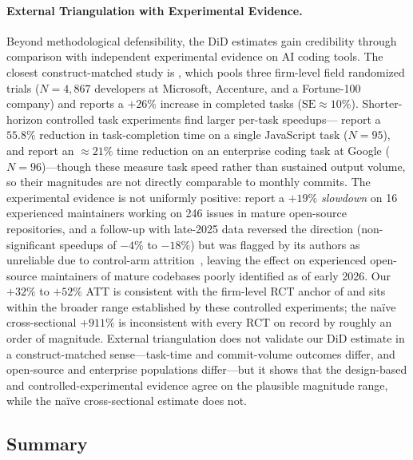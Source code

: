 \paragraph{External Triangulation with Experimental Evidence.}
\label{sec:triangulation}

Beyond methodological defensibility, the DiD estimates gain credibility through comparison with independent experimental evidence on AI coding tools.
The closest construct-matched study is \citet{cui2025effects}, which pools three firm-level field randomized trials ($N = 4{,}867$ developers at Microsoft, Accenture, and a Fortune-100 company) and reports a $+26\%$ increase in completed tasks ($\text{SE} \approx 10\%$).
Shorter-horizon controlled task experiments find larger per-task speedups---\citet{peng2023impact} report a $55.8\%$ reduction in task-completion time on a single JavaScript task ($N = 95$), and \citet{DBLP:conf/icse-seip/ParadisGMNMMZFC25} report an $\approx 21\%$ time reduction on an enterprise coding task at Google ($N = 96$)---though these measure task speed rather than sustained output volume, so their magnitudes are not directly comparable to monthly commits.
The experimental evidence is not uniformly positive: \citet{becker2025measuring} report a $+19\%$ \emph{slowdown} on 16 experienced maintainers working on 246 issues in mature open-source repositories, and a follow-up with late-2025 data reversed the direction (non-significant speedups of $-4\%$ to $-18\%$) but was flagged by its authors as unreliable due to control-arm attrition~\cite{metr2026uplift}, leaving the effect on experienced open-source maintainers of mature codebases poorly identified as of early 2026.
Our $+32\%$ to $+52\%$ ATT is consistent with the firm-level RCT anchor of \citet{cui2025effects} and sits within the broader range established by these controlled experiments; the na\"ive cross-sectional $+911\%$ is inconsistent with every RCT on record by roughly an order of magnitude.
External triangulation does not validate our DiD estimate in a construct-matched sense---task-time and commit-volume outcomes differ, and open-source and enterprise populations differ---but it shows that the design-based and controlled-experimental evidence agree on the plausible magnitude range, while the na\"ive cross-sectional estimate does not.

\subsection{Summary}
\label{sec:summary}

